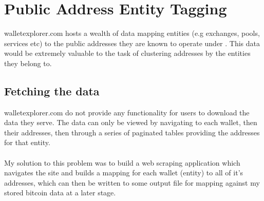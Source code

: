\section{Public Address Entity Tagging}
walletexplorer.com hosts a wealth of data mapping entities (e.g exchanges, pools, services etc) to the public addresses they are known to operate under \cite{RefWorks:doc:5c4b26f3e4b0ea619646d513}. This data would be extremely valuable to the task of clustering addresses by the entities they belong to. 

\subsection{Fetching the data}\label{design:fetch-entity-data}
walletexplorer.com do not provide any functionality for users to download the data they serve. The data can only be viewed by navigating to each wallet, then their addresses, then through a series of paginated tables providing the addresses for that entity. 
\\\\
My solution to this problem was to build a web scraping application which navigates the site and builds a mapping for each wallet (entity) to all of it's addresses, which can then be written to some output file for mapping against my stored bitcoin data at a later stage. 

